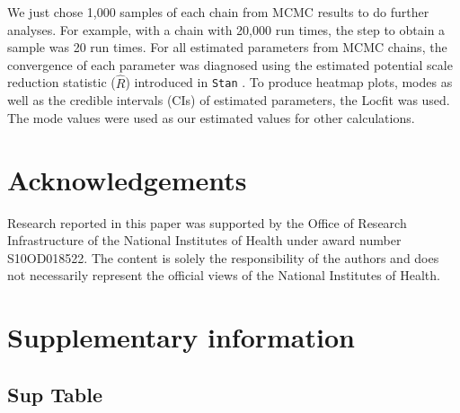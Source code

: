 \documentclass[]{article}
\begin{document}
We just chose 1,000 samples of each chain from MCMC results to do
further analyses. For example, with a chain with 20,000 run times, the step to obtain a sample was 20 run times. For all
estimated parameters from MCMC chains, the convergence of each
parameter was diagnosed using the estimated potential
scale reduction statistic ($\hat{R}$) introduced in \texttt{Stan} \citep{carpenter2015stan}. To produce heatmap plots, modes as well as the credible intervals (CIs) of estimated parameters, the Locfit \citep{loader2007locfit} was used. The mode values were used as our estimated values for other calculations.




\section{Acknowledgements}

Research reported in this paper was supported by the Office of Research Infrastructure of the National Institutes of Health under
award number S10OD018522. The content is solely the responsibility of the authors and does not necessarily represent the official views of
the National Institutes of Health.

\section{Supplementary information}

\setcounter{figure}{0}
\renewcommand{\thefigure}{S\arabic{figure}}



\setcounter{table}{0}
\renewcommand{\thetable}{S\arabic{table}}

\subsection{Sup Table}
\end{document}
